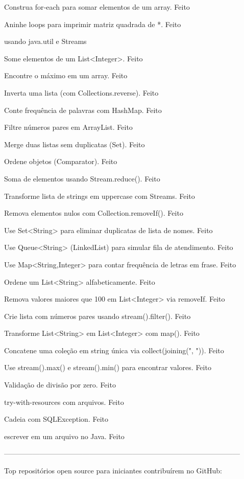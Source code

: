 Construa  for‑each para somar elementos de um array. Feito

Aninhe loops para imprimir matriz quadrada de *. Feito

usando java.util e Streams

Some elementos de um List<Integer>. Feito

Encontre o máximo em um array. Feito

Inverta uma lista (com Collections.reverse). Feito

Conte frequência de palavras com HashMap. Feito

Filtre números pares em ArrayList. Feito

Merge duas listas sem duplicatas (Set). Feito

Ordene objetos (Comparator). Feito

Soma de elementos usando Stream.reduce(). Feito

Transforme lista de strings em uppercase com Streams. Feito

Remova elementos nulos com Collection.removeIf(). Feito

Use Set<String> para eliminar duplicatas de lista de nomes. Feito

Use Queue<String> (LinkedList) para simular fila de atendimento. Feito

Use Map<String,Integer> para contar frequência de letras em frase. Feito

Ordene um List<String> alfabeticamente. Feito

Remova valores maiores que 100 em List<Integer> via removeIf. Feito

Crie lista com números pares usando stream().filter(). Feito

Transforme List<String> em List<Integer> com map(). Feito

Concatene uma coleção em string única via collect(joining(", ")). Feito

Use stream().max() e stream().min() para encontrar valores. Feito

Validação de divisão por zero. Feito

try-with-resources com arquivos. Feito

Cadeia com SQLException. Feito

escrever em um arquivo no Java. Feito

---------------------------------------------------------------------------------------------------

Top repositórios open source para iniciantes contribuírem no GitHub:

